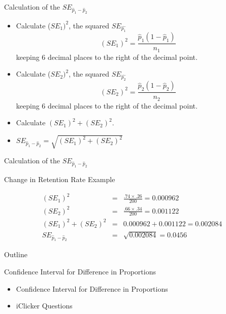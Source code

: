 \documentclass[14pt]{beamer}\usepackage[]{graphicx}\usepackage[]{color}
\begin{document}
\begin{frame}[fragile]{Calculation of the $SE_{\hat{p}_1 - \hat{p}_2}$}

{\footnotesize{
\begin{itemize}
\item<1-> Calculate ($SE_1)^2$, the squared $SE_{\hat{p_1}}$
\begin{equation*}
  (SE_1)^2 =  \frac{ \hat{p}_1 (1 - \hat{p}_1)}{n_1}
\end{equation*}
keeping 6 decimal places to the right of the decimal point.  
\item<2-> Calculate ($SE_2)^2$, the squared $SE_{\hat{p_2}}$
\begin{equation*}
  (SE_2)^2 = \frac{ \hat{p}_2 (1 - \hat{p}_2)}{n_2} 
\end{equation*}
keeping 6 decimal places to the right of the decimal point.  
\item<3-> Calculate $(SE_1)^2 + (SE_2)^2$.
\item<4-> $SE_{\hat{p}_1 - \hat{p}_2} = \sqrt{(SE_1)^2 + (SE_2)^2}$

\end{itemize}
}}
\end{frame}

\begin{frame}[fragile]{Calculation of the $SE_{\hat{p}_1 - \hat{p}_2}$}

Change in Retention Rate Example

\begin{eqnarray*}
(SE_1)^2 &=& \frac{.74 \times .26}{200} = 0.000962 \\
(SE_2)^2 &=& \frac{.66 \times .34}{200} = 0.001122 \\
(SE_1)^2 + (SE_2)^2 &=& 0.000962 + 0.001122 = 0.002084 \\
SE_{ \hat{p}_1 - \hat{p}_2} &=& \sqrt{0.002084} = 0.0456
\end{eqnarray*}
\end{frame}

\begin{frame}[fragile]{Outline}

Confidence Interval for Difference in Proportions  

\begin{itemize}
\item Confidence Interval for Difference in Proportions  
\item iClicker Questions
\end{itemize}

\end{frame}
\end{document}
